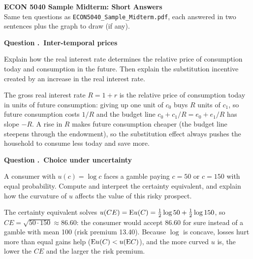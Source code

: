\documentclass[11pt]{article}
\newcounter{qn}
\newcommand{\question}[1]{\refstepcounter{qn}\par\medskip
{\bfseries\color{ink}Question \theqn.\ #1}\par\smallskip}
\begin{document}
\begin{center}
{\LARGE\bfseries\color{ink} ECON 5040 Sample Midterm: Short Answers}\\[3pt]
{\small Same ten questions as \texttt{ECON5040\_Sample\_Midterm.pdf}, each answered in two sentences plus the graph to draw (if any).}
\end{center}

\question{Inter-temporal prices}
Explain how the real interest rate determines the relative price of consumption today and consumption in the future. Then explain the substitution incentive created by an increase in the real interest rate.

\begin{answer}
\begin{minipage}[t]{0.58\textwidth}\vspace{0pt}
The gross real interest rate $R=1+r$ is the relative price of consumption today in units of future consumption: giving up one unit of $c_0$ buys $R$ units of $c_1$, so future consumption costs $1/R$ and the budget line $c_0+c_1/R=e_0+e_1/R$ has slope $-R$. A rise in $R$ makes future consumption cheaper (the budget line steepens through the endowment), so the substitution effect always pushes the household to consume less today and save more.
\end{minipage}\hfill
\begin{minipage}[t]{0.38\textwidth}\vspace{0pt}\centering
\scalebox{0.85}{\figIntertemporal}
\end{minipage}
\end{answer}

\question{Choice under uncertainty}
A consumer with $u(c)=\log c$ faces a gamble paying $c=50$ or $c=150$ with equal probability. Compute and interpret the certainty equivalent, and explain how the curvature of $u$ affects the value of this risky prospect.

\begin{answer}
\begin{minipage}[t]{0.58\textwidth}\vspace{0pt}
The certainty equivalent solves $u(CE)=\mathrm{E} u(C)=\tfrac12\log50+\tfrac12\log150$, so $CE=\sqrt{50\cdot150}\approx\mathbf{86.60}$: the consumer would accept 86.60 for sure instead of a gamble with mean 100 (risk premium 13.40). Because $\log$ is concave, losses hurt more than equal gains help ($\mathrm{E} u(C)<u(\mathrm{E} C)$), and the more curved $u$ is, the lower the $CE$ and the larger the risk premium.
\end{minipage}\hfill
\begin{minipage}[t]{0.38\textwidth}\vspace{0pt}\centering
\scalebox{0.85}{\figCE}
\end{minipage}
\end{answer}
\end{document}
